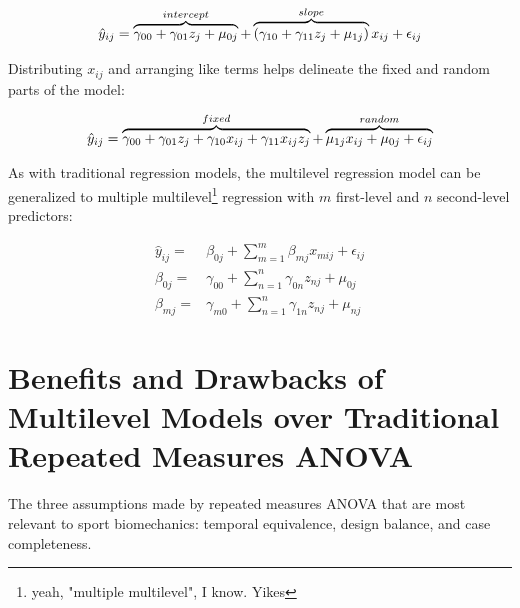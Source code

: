 \documentclass[
]{article}
\begin{document}
\begin{equation}
\hat{y}_{ij}=\overbrace{\textstyle \gamma_{00}+\gamma_{01}z_{j}+\mu_{0j}}^{\mathclap{intercept}}+
\overbrace{\textstyle (\gamma_{10}+\gamma_{11}z_{j}+\mu_{1j})}^{\mathclap{slope}}x_{ij}+\epsilon_{ij}
\label{eq:mlm2}
\end{equation}

\noindent
Distributing \(x_{ij}\) and arranging like terms helps delineate the fixed and random parts of the model:

\begin{equation}
\hat{y}_{ij}=\overbrace{\textstyle 
\gamma_{00}+\gamma_{01}z_{j}+\gamma_{10}x_{ij}+\gamma_{11}x_{ij}z_{j}}^{\mathclap{fixed}}+
\overbrace{\textstyle \mu_{1j}x_{ij}+\mu_{0j}+\epsilon_{ij}}^{\mathclap{random}}
\label{eq:mlm3}
\end{equation}

\noindent
As with traditional regression models, the multilevel regression model can be generalized to multiple multilevel\footnote{yeah, "multiple multilevel", I know. Yikes} regression with \(m\) first-level and \(n\) second-level predictors:

\begin{align}
\hat{y}_{ij}=&\beta_{0j}+\sum\limits_{m=1}^{m}\beta_{mj}x_{mij}+\epsilon_{ij}\\
\beta_{0j}=&\gamma_{00}+\sum\limits_{n=1}^{n}\gamma_{0n}z_{nj}+\mu_{0j}\\
\beta_{mj}=&\gamma_{m0}+\sum\limits_{n=1}^{n}\gamma_{1n}z_{nj}+\mu_{nj}
\label{eq:mlm4}
\end{align}

\hypertarget{benefits-and-drawbacks-of-multilevel-models-over-traditional-repeated-measures-anova}{%
\section{Benefits and Drawbacks of Multilevel Models over Traditional Repeated Measures ANOVA}\label{benefits-and-drawbacks-of-multilevel-models-over-traditional-repeated-measures-anova}}

The three assumptions made by repeated measures ANOVA that are most relevant to sport biomechanics: temporal equivalence, design balance, and case completeness.
\end{document}
